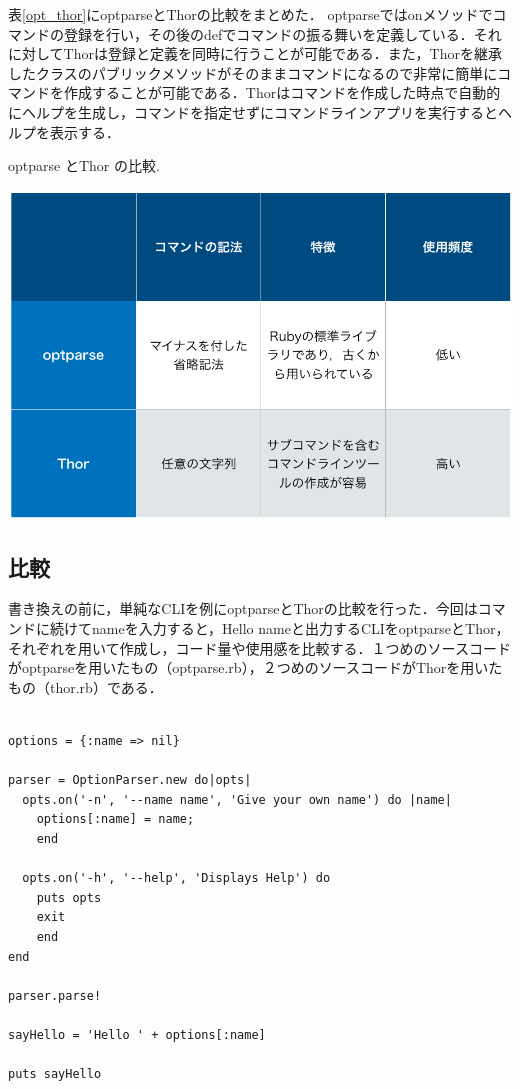 表\ref{opt_thor}にoptparseとThorの比較をまとめた．
optparseではonメソッドでコマンドの登録を行い，その後のdefでコマンドの振る舞いを定義している．それに対してThorは登録と定義を同時に行うことが可能である．また，Thorを継承したクラスのパブリックメソッドがそのままコマンドになるので非常に簡単にコマンドを作成することが可能である．Thorはコマンドを作成した時点で自動的にヘルプを生成し，コマンドを指定せずにコマンドラインアプリを実行するとヘルプを表示する．
\begin{table}[H]
\centering
\begin{center}
\caption{optparse とThor の比較. \label{opt_thor}}
\includegraphics[width=150mm]{../.././figs/opt_thor.png}
\end{center}


\label{fig:This}
\end{table}

\subsection{比較}\label{}

書き換えの前に，単純なCLIを例にoptparseとThorの比較を行った．今回はコマンドに続けてnameを入力すると，Hello nameと出力するCLIをoptparseとThor，それぞれを用いて作成し，コード量や使用感を比較する．１つめのソースコードがoptparseを用いたもの（optparse.rb），２つめのソースコードがThorを用いたもの（thor.rb）である．

\begin{screen}
{\small
\begin{verbatim}

options = {:name => nil}

parser = OptionParser.new do|opts|
  opts.on('-n', '--name name', 'Give your own name') do |name|
    options[:name] = name;
    end

  opts.on('-h', '--help', 'Displays Help') do
    puts opts
    exit
    end
end

parser.parse!

sayHello = 'Hello ' + options[:name]

puts sayHello

\end{verbatim}}
\end{screen}

